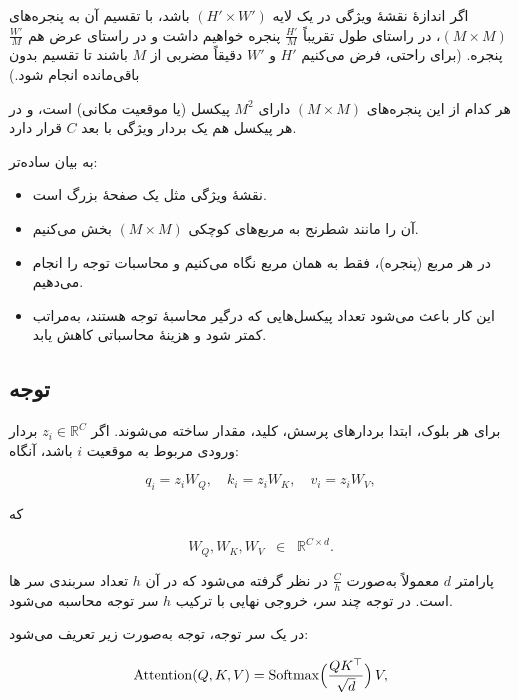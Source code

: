 اگر اندازهٔ نقشهٔ ویژگی در یک لایه 
\(\displaystyle (H' \times W')\) باشد، 
با تقسیم آن به پنجره‌های 
\(\displaystyle (M \times M)\)، 
در راستای طول تقریباً 
\(\displaystyle \tfrac{H'}{M}\) پنجره خواهیم داشت 
و در راستای عرض هم 
\(\displaystyle \tfrac{W'}{M}\) پنجره.
(برای راحتی، فرض می‌کنیم 
\(\displaystyle H'\) و \(\displaystyle W'\) 
دقیقاً مضربی از \(\displaystyle M\) باشند 
تا تقسیم بدون باقی‌مانده انجام شود.)

هر کدام از این پنجره‌های 
\(\displaystyle (M \times M)\) 
دارای 
\(\displaystyle M^2\) پیکسل (یا موقعیت مکانی) است، 
و در هر پیکسل هم یک بردار ویژگی با بعد \(\displaystyle C\) قرار دارد.

به بیان ساده‌تر:
\begin{itemize}
	\item نقشهٔ ویژگی مثل یک صفحهٔ بزرگ است.
	\item آن را مانند شطرنج به مربع‌های کوچکی \(\displaystyle (M \times M)\) بخش می‌کنیم.
	\item در هر مربع (پنجره)، فقط به همان مربع نگاه می‌کنیم و محاسبات  توجه  را انجام می‌دهیم.
	\item این کار باعث می‌شود تعداد پیکسل‌هایی که درگیر محاسبهٔ توجه هستند، 
	به‌مراتب کمتر شود و هزینهٔ محاسباتی کاهش یابد.
\end{itemize}


\subsection{توجه}

برای هر بلوک، ابتدا بردارهای پرسش، کلید، مقدار ساخته می‌شوند. 
اگر \(\displaystyle z_i \in \mathbb{R}^C\) بردار ورودی مربوط به موقعیت \(i\) باشد، آنگاه:


\begin{equation}
	q_i = z_i W_Q, 
	\quad
	k_i = z_i W_K,
	\quad
	v_i = z_i W_V,
\end{equation}

	که 

\[
W_Q, W_K, W_V \;\;\in \;\;\mathbb{R}^{C \times d}.
\]

پارامتر \(\displaystyle d\) معمولاً به‌صورت \(\displaystyle \tfrac{C}{h}\) در نظر گرفته می‌شود 
که در آن \(\displaystyle h\) تعداد سربندی  سر ها است. 
در توجه چند سر، خروجی نهایی با ترکیب \(\displaystyle h\) سر توجه محاسبه می‌شود.

در یک سر توجه، توجه به‌صورت زیر تعریف می‌شود:

\begin{equation}
	\mathrm{Attention}(Q, K, V)
	=
	\mathrm{Softmax}\Bigl(\frac{QK^\top}{\sqrt{d}}\Bigr)\,V,
\end{equation}

